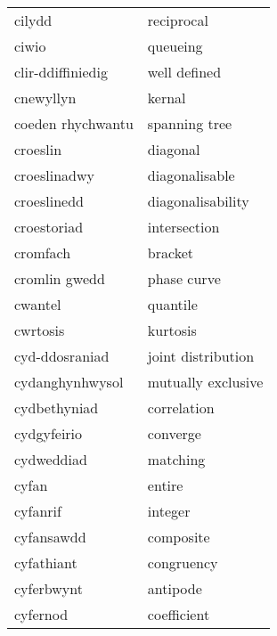 \begin{supertabular}{p{0.22\textwidth}p{0.22\textwidth}}
                          cilydd &                        reciprocal \\
                           ciwio &                          queueing \\
               clir-ddiffiniedig &                      well defined \\
                       cnewyllyn &                            kernal \\
               coeden rhychwantu &                     spanning tree \\
                        croeslin &                          diagonal \\
                    croeslinadwy &                    diagonalisable \\
                     croeslinedd &                 diagonalisability \\
                     croestoriad &                      intersection \\
                        cromfach &                           bracket \\
                   cromlin gwedd &                       phase curve \\
                         cwantel &                          quantile \\
                        cwrtosis &                          kurtosis \\
                  cyd-ddosraniad &                joint distribution \\
                 cydanghynhwysol &                mutually exclusive \\
                    cydbethyniad &                       correlation \\
                     cydgyfeirio &                          converge \\
                      cydweddiad &                          matching \\
                           cyfan &                            entire \\
                        cyfanrif &                           integer \\
                      cyfansawdd &                         composite \\
                      cyfathiant &                        congruency \\
                      cyferbwynt &                          antipode \\
                        cyfernod &                       coefficient \\

\end{supertabular}
